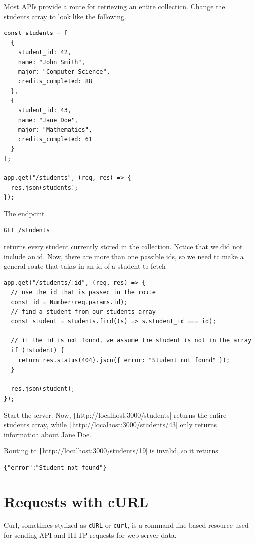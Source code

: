 Most APIs provide a route for retrieving an entire collection. Change the students array 
to look like the following.
\begin{verbatim}
const students = [
  {
    student_id: 42,
    name: "John Smith",
    major: "Computer Science",
    credits_completed: 88
  },
  {
    student_id: 43,
    name: "Jane Doe",
    major: "Mathematics",
    credits_completed: 61
  }
];

app.get("/students", (req, res) => {
  res.json(students);
});
\end{verbatim}

The endpoint

\begin{verbatim}
GET /students
\end{verbatim}

returns every student currently stored in the collection. Notice that we did not include an id. 
Now, there are more than one possible ids, so we need to make a general route that takes in an id 
of a student to fetch
\begin{verbatim}
app.get("/students/:id", (req, res) => {
  // use the id that is passed in the route
  const id = Number(req.params.id);
  // find a student from our students array
  const student = students.find((s) => s.student_id === id);

  // if the id is not found, we assume the student is not in the array
  if (!student) {
    return res.status(404).json({ error: "Student not found" });
  }

  res.json(student);
});
\end{verbatim}
Start the server. Now, \texttt|http://localhost:3000/students| returns the 
entire students array, while \texttt|http://localhost:3000/students/43| only returns 
information about Jane Doe.

Routing to \texttt|http://localhost:3000/students/19| is invalid, so it returns
\begin{verbatim}
{"error":"Student not found"}
\end{verbatim}

\section{Requests with cURL}
Curl, sometimes stylized as \texttt{cURL} or \texttt{curl}, is a command-line based resource 
used for sending API and HTTP requests for web server data.

